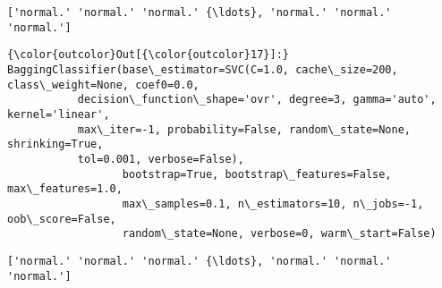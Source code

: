 \documentclass[11pt]{article}
\begin{document}
    \begin{Verbatim}[commandchars=\\\{\}]
['normal.' 'normal.' 'normal.' {\ldots}, 'normal.' 'normal.' 'normal.']

    \end{Verbatim}

\begin{Verbatim}[commandchars=\\\{\}]
{\color{outcolor}Out[{\color{outcolor}17}]:} BaggingClassifier(base\_estimator=SVC(C=1.0, cache\_size=200, class\_weight=None, coef0=0.0,
           decision\_function\_shape='ovr', degree=3, gamma='auto', kernel='linear',
           max\_iter=-1, probability=False, random\_state=None, shrinking=True,
           tol=0.001, verbose=False),
                  bootstrap=True, bootstrap\_features=False, max\_features=1.0,
                  max\_samples=0.1, n\_estimators=10, n\_jobs=-1, oob\_score=False,
                  random\_state=None, verbose=0, warm\_start=False)
\end{Verbatim}
            
    \begin{Verbatim}[commandchars=\\\{\}]
['normal.' 'normal.' 'normal.' {\ldots}, 'normal.' 'normal.' 'normal.']

    \end{Verbatim}
\end{document}
